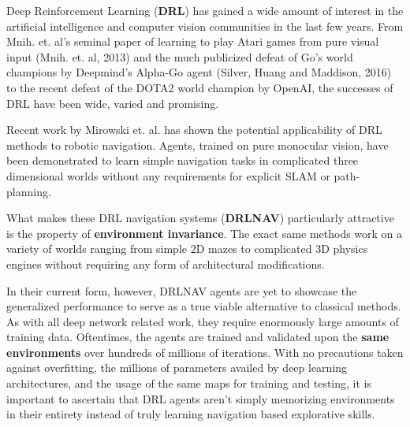 
Deep Reinforcement Learning (\textbf{DRL}) has gained a wide amount of interest in the artificial intelligence and computer vision communities in the last few years.
From Mnih. et. al's seminal paper of learning to play Atari games from pure visual input (Mnih. et. al, 2013) and the much publicized defeat of Go's world champions by Deepmind's Alpha-Go agent (Silver, Huang and Maddison, 2016) to the recent defeat of the DOTA2 world champion by OpenAI, the successes of DRL have been wide, varied and promising. 

Recent work by Mirowski et. al. has shown the potential applicability of DRL methods to robotic navigation. Agents, trained on pure monocular vision, have been demonstrated to learn simple navigation tasks in complicated three dimensional worlds without any requirements for explicit SLAM or path-planning. 
 
What makes these DRL navigation systems (\textbf{DRLNAV}) particularly attractive is the property of \textbf{environment invariance}. The exact same methods work on a variety of worlds ranging from simple 2D mazes to complicated 3D physics engines without requiring any form of architectural modifications.

In their current form, however, DRLNAV agents are yet to showcase the generalized performance to serve as a true viable alternative to classical methods. As with all deep network related work, they require enormously large amounts of training data. Oftentimes, the agents are trained and validated upon the \textbf{same environments} over hundreds of millions of iterations. With no precautions taken against overfitting, the millions of parameters availed by deep learning architectures, and the usage of the same maps for training and testing, it is important to ascertain that DRL agents aren't simply memorizing environments in their entirety instead of truly learning navigation based explorative skills.
 
